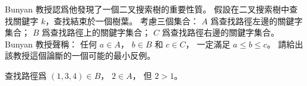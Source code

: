 \startEXERCISE
Bunyan 教授認爲他發現了一個二叉搜索樹的重要性質。
假設在二叉搜索樹中查找關鍵字 $k$，查找結束於一個樹葉。
考慮三個集合：
 $A$ 爲查找路徑左邊的關鍵字集合；
 $B$ 爲查找路徑上的關鍵字集合；
 $C$ 爲查找路徑右邊的關鍵字集合。
 Bunyan 教授聲稱：
任何 $a\in A$， $b\in B$ 和 $c\in C$，
一定滿足 $a\le b\le c$。
請給出該教授這個論斷的一個可能的最小反例。
\stopEXERCISE

\startANSWER
\externalfigure[e12_2_4-1]
查找路徑爲 $(1,3,4)\in B$， $2\in A$，
但 $2>1$。
\stopANSWER
